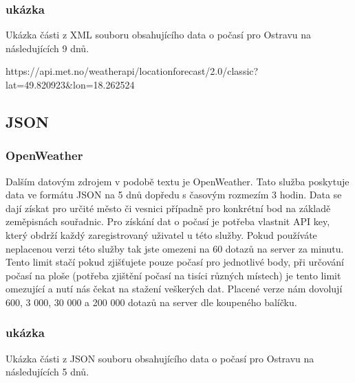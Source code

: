 \documentclass[czech,bachelor,dept460,male,csharp,cpdeclaration]{diploma}
\begin{document}
	\subsubsection{ukázka}
	
	Ukázka části z XML souboru obsahujícího data o počasí pro Ostravu na následujících 9 dnů.
	
	https://api.met.no/weatherapi/locationforecast/2.0/classic?lat=49.820923\&lon=18.262524
	
	
	
	\subsection{JSON}
	\subsubsection{OpenWeather}
	
	Dalším datovým zdrojem v podobě textu je OpenWeather. Tato služba poskytuje data ve formátu JSON na 5 dnů dopředu s časovým rozmezím 3 hodin. Data se dají získat pro určité město či vesnici případně pro konkrétní bod na základě zeměpisnách souřadnic. Pro získání dat o počasí je potřeba vlastnit API key, který obdrží každý zaregistrovaný uživatel u této služby. Pokud používáte neplacenou verzi této služby tak jste omezeni na 60 dotazů na server za minutu. Tento limit stačí pokud zjišťujete pouze počasí pro jednotlivé body, při určování počasí na ploše (potřeba zjištění počasí na tisíci různých místech) je tento limit omezující a nutí nás čekat na stažení veškerých dat. Placené verze nám dovolují 600, 3 000, 30 000 a 200 000 dotazů na server dle koupeného balíčku.
	
	\subsubsection{ukázka}
	
	Ukázka části z JSON souboru obsahujícího data o počasí pro Ostravu na následujících 5 dnů.
	
\end{document}
